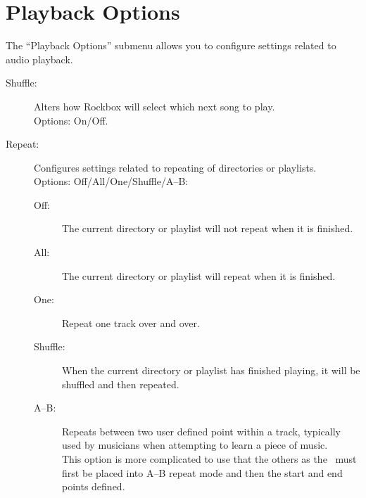 \section{\label{ref:PlaybackOptions}Playback Options}
  The ``Playback Options'' submenu allows you to configure settings related to audio playback.
  \begin{description}
    \item[Shuffle: ]Alters how Rockbox will select which next song to play.\\
      Options: On/Off.
    \item[Repeat: ]Configures settings related to repeating of directories or playlists.\\
      Options: Off/All/One/Shuffle/A--B:
      \begin{description}
        \item[Off: ]The current directory or playlist will not repeat 
          when it is finished.\\
        \item[All: ]The current directory or playlist will repeat when it is finished.\\
        \item[One: ]Repeat one track over and over.
        \item[Shuffle: ]When the current directory or playlist has finished playing, it 
          will be shuffled and then repeated.
        \item[A--B: ]Repeats between two user defined point within a track, typically
          used by musicians when attempting to learn a piece of music.\\
          This option is more complicated to use that the others as the \dap\ must first be 
          placed into A--B repeat mode and then the start and end points defined.\\
      \end{description}


\end{description}
